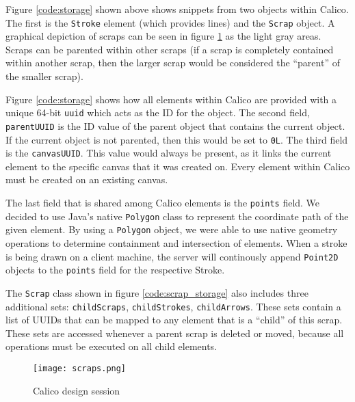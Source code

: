 Figure \ref{code:storage} shown above shows snippets from two objects within Calico. The first is the \texttt{Stroke} element (which provides lines) and the \texttt{Scrap} object. A graphical depiction of scraps can be seen in figure \ref{fig:scraps_storage} as the light gray areas. Scraps can be parented within other scraps (if a scrap is completely contained within another scrap, then the larger scrap would be considered the ``parent'' of the smaller scrap).

Figure \ref{code:storage} shows how all elements within Calico are provided with a unique 64-bit \texttt{uuid} which acts as the ID for the object. The second field, \texttt{parentUUID} is the ID value of the parent object that contains the current object. If the current object is not parented, then this would be set to \texttt{0L}. The third field is the \texttt{canvasUUID}. This value would always be present, as it links the current element to the specific canvas that it was created on. Every element within Calico must be created on an existing canvas. 

The last field that is shared among Calico elements is the \texttt{points} field. We decided to use Java's native \texttt{Polygon} class to represent the coordinate path of the given element. By using a \texttt{Polygon} object, we were able to use native geometry operations to determine containment and intersection of elements. When a stroke is being drawn on a client machine, the server will continously append \texttt{Point2D} objects to the \texttt{points} field for the respective Stroke. 

The \texttt{Scrap} class shown in figure \ref{code:scrap_storage} also includes three additional sets: \texttt{childScraps}, \texttt{childStrokes}, \texttt{childArrows}. These sets contain a list of UUIDs that can be mapped to any element that is a ``child'' of this scrap. These sets are accessed whenever a parent scrap is deleted or moved, because all operations must be executed on all child elements.


\begin{figure}[h!]
  \centering
  \texttt{[image: scraps.png]}
  \caption{Calico design session}
  \label{fig:scraps_storage}
\end{figure}

